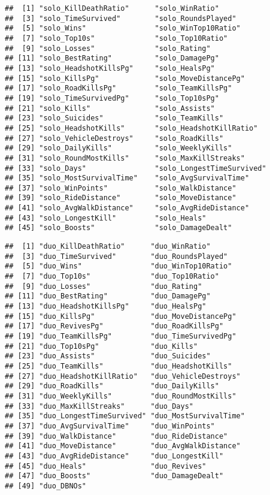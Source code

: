 \documentclass[]{article}
\begin{document}
\begin{verbatim}
##  [1] "solo_KillDeathRatio"      "solo_WinRatio"           
##  [3] "solo_TimeSurvived"        "solo_RoundsPlayed"       
##  [5] "solo_Wins"                "solo_WinTop10Ratio"      
##  [7] "solo_Top10s"              "solo_Top10Ratio"         
##  [9] "solo_Losses"              "solo_Rating"             
## [11] "solo_BestRating"          "solo_DamagePg"           
## [13] "solo_HeadshotKillsPg"     "solo_HealsPg"            
## [15] "solo_KillsPg"             "solo_MoveDistancePg"     
## [17] "solo_RoadKillsPg"         "solo_TeamKillsPg"        
## [19] "solo_TimeSurvivedPg"      "solo_Top10sPg"           
## [21] "solo_Kills"               "solo_Assists"            
## [23] "solo_Suicides"            "solo_TeamKills"          
## [25] "solo_HeadshotKills"       "solo_HeadshotKillRatio"  
## [27] "solo_VehicleDestroys"     "solo_RoadKills"          
## [29] "solo_DailyKills"          "solo_WeeklyKills"        
## [31] "solo_RoundMostKills"      "solo_MaxKillStreaks"     
## [33] "solo_Days"                "solo_LongestTimeSurvived"
## [35] "solo_MostSurvivalTime"    "solo_AvgSurvivalTime"    
## [37] "solo_WinPoints"           "solo_WalkDistance"       
## [39] "solo_RideDistance"        "solo_MoveDistance"       
## [41] "solo_AvgWalkDistance"     "solo_AvgRideDistance"    
## [43] "solo_LongestKill"         "solo_Heals"              
## [45] "solo_Boosts"              "solo_DamageDealt"
\end{verbatim}

\begin{verbatim}
##  [1] "duo_KillDeathRatio"      "duo_WinRatio"           
##  [3] "duo_TimeSurvived"        "duo_RoundsPlayed"       
##  [5] "duo_Wins"                "duo_WinTop10Ratio"      
##  [7] "duo_Top10s"              "duo_Top10Ratio"         
##  [9] "duo_Losses"              "duo_Rating"             
## [11] "duo_BestRating"          "duo_DamagePg"           
## [13] "duo_HeadshotKillsPg"     "duo_HealsPg"            
## [15] "duo_KillsPg"             "duo_MoveDistancePg"     
## [17] "duo_RevivesPg"           "duo_RoadKillsPg"        
## [19] "duo_TeamKillsPg"         "duo_TimeSurvivedPg"     
## [21] "duo_Top10sPg"            "duo_Kills"              
## [23] "duo_Assists"             "duo_Suicides"           
## [25] "duo_TeamKills"           "duo_HeadshotKills"      
## [27] "duo_HeadshotKillRatio"   "duo_VehicleDestroys"    
## [29] "duo_RoadKills"           "duo_DailyKills"         
## [31] "duo_WeeklyKills"         "duo_RoundMostKills"     
## [33] "duo_MaxKillStreaks"      "duo_Days"               
## [35] "duo_LongestTimeSurvived" "duo_MostSurvivalTime"   
## [37] "duo_AvgSurvivalTime"     "duo_WinPoints"          
## [39] "duo_WalkDistance"        "duo_RideDistance"       
## [41] "duo_MoveDistance"        "duo_AvgWalkDistance"    
## [43] "duo_AvgRideDistance"     "duo_LongestKill"        
## [45] "duo_Heals"               "duo_Revives"            
## [47] "duo_Boosts"              "duo_DamageDealt"        
## [49] "duo_DBNOs"
\end{verbatim}
\end{document}
